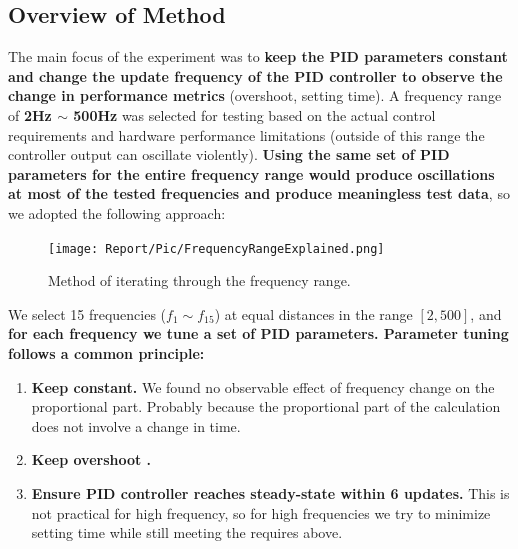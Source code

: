 \documentclass[conference]{IEEEtran}
\begin{document}
\subsection{Overview of Method}
\label{PIDTuningMethod}
The main focus of the experiment was to \textbf{keep the PID parameters constant and change the update frequency of the PID controller to observe the change in performance metrics} (overshoot, setting time). A frequency range of \textbf{2Hz $\sim$ 500Hz} was selected for testing based on the actual control requirements and hardware performance limitations (outside of this range the controller output can oscillate violently). \textbf{Using the same set of PID parameters for the entire frequency range would produce oscillations at most of the tested frequencies and produce meaningless test data}, so we adopted the following approach: 

\begin{figure}[htbp]
\centerline{\texttt{[image: Report/Pic/FrequencyRangeExplained.png]}}
\caption{Method of iterating through the frequency range.}%
\label{fig_FrequencyRange}
\end{figure}

We select 15 frequencies ($f_{1}\sim f_{15}$) at equal distances in the range $[2,500]$,  and \textbf{for each frequency we tune a set of PID parameters. Parameter tuning follows a common principle:}
\begin{enumerate}
    \item\textbf{ Keep  constant. }We found no observable effect of frequency change on the proportional part. Probably because the proportional part of the calculation does not involve a change in time.
    \item\textbf{ Keep overshoot . }
    \item\textbf{ Ensure PID controller reaches steady-state within 6 updates.} This is not practical for high frequency, so for high frequencies we try to minimize setting time  while still meeting the requires above. 
\end{enumerate}
\end{document}
